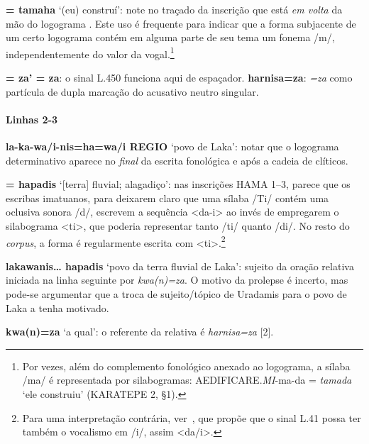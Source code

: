 \noindent{} \textbf{= tamaha} `(eu) construí': note no
traçado da inscrição que  está \emph{em volta} da mão do
logograma . Este uso é frequente para indicar que a
forma subjacente de um certo logograma contém em alguma parte de seu tema um
fonema /m/, independentemente do valor da vogal.\footnote{Por vezes, além
	do complemento fonológico anexado ao logograma, a sílaba /ma/ é representada
	por silabogramas: AEDIFICARE.\emph{MI}-ma-da = \emph{tamada} `ele construiu'
	(KARATEPE 2, §1).}

\noindent{} \textbf{= za' = za}: o sinal L.450  funciona
aqui de espaçador.
\textbf{harnisa=za}: \emph{=za} como partícula de dupla marcação do acusativo
neutro singular.

\paragraph{Linhas 2-3}
\textbf{la-ka-wa/i-nis=ha=wa/i REGIO} `povo de Laka': notar que o logograma
determinativo aparece no \emph{final} da escrita fonológica e após a cadeia de
clíticos.

\noindent{} \textbf{= hapadis} `[terra] fluvial;
alagadiço': nas inscrições HAMA 1--3, parece que os escribas imatuanos,
para deixarem claro que uma sílaba /Ti/ contém uma oclusiva sonora /d/,
escrevem a sequência  <da-i> ao invés de empregarem o
silabograma  <ti>, que poderia representar tanto /ti/ quanto
/di/. No resto do \emph{corpus}, a forma é regularmente escrita com
 <ti>.\footnote{
	Para uma interpretação contrária, ver~\citet{Simon2019}, que propõe que o
	sinal L.41 possa ter também o vocalismo em /i/, assim <da/i>.
}

\noindent\textbf{lakawanis\ldots{} hapadis} `povo da terra fluvial de Laka': sujeito da
oração relativa iniciada na linha seguinte por \emph{kwa{(n)}=za}.
O motivo da prolepse é incerto, mas pode-se argumentar que a troca de
sujeito\slash{}tópico de Uradamis para o povo de Laka a tenha motivado.

\noindent\textbf{kwa{(n)}=za} `a qual': o referente da relativa é \emph{harnisa=za}
[2].

